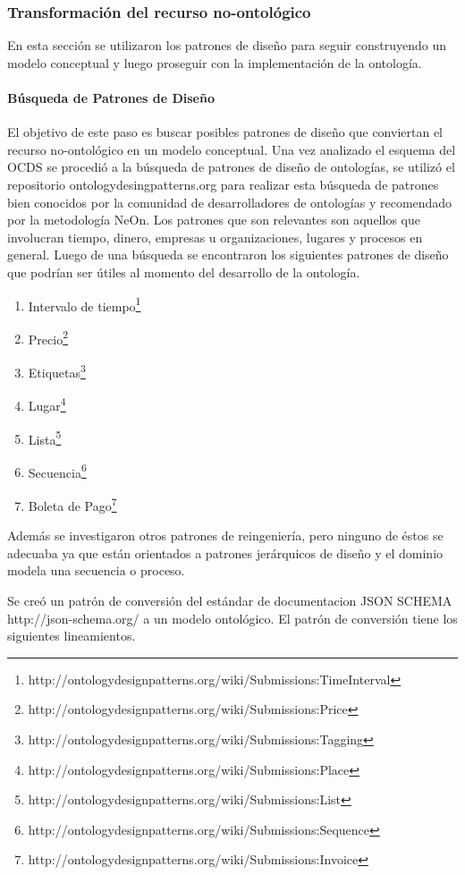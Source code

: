 \subsubsection{Transformación del recurso no-ontológico}
En esta sección se utilizaron los patrones de diseño para seguir construyendo un modelo conceptual y luego proseguir con la implementación de la ontología. 
\paragraph{Búsqueda de Patrones de Diseño}
El objetivo de este paso es buscar posibles patrones de diseño que conviertan el recurso no-ontológico en un modelo conceptual. 
Una vez analizado el esquema del OCDS se procedió a la búsqueda de patrones de diseño de ontologías, se utilizó el repositorio ontologydesingpatterns.org para realizar esta búsqueda de patrones bien conocidos por la comunidad de desarrolladores de ontologías y recomendado por la metodología NeOn.
Los patrones que son relevantes son aquellos que involucran tiempo, dinero, empresas u organizaciones, lugares y procesos en general. Luego de una búsqueda se encontraron los siguientes patrones de diseño que podrían ser útiles al momento del desarrollo de la ontología.
\begin{enumerate}
    \item Intervalo de tiempo\footnote{http://ontologydesignpatterns.org/wiki/Submissions:TimeInterval}
    \item Precio\footnote{http://ontologydesignpatterns.org/wiki/Submissions:Price} 
    \item Etiquetas\footnote{http://ontologydesignpatterns.org/wiki/Submissions:Tagging}
    \item Lugar\footnote{http://ontologydesignpatterns.org/wiki/Submissions:Place}
    \item Lista\footnote{http://ontologydesignpatterns.org/wiki/Submissions:List}
    \item Secuencia\footnote{http://ontologydesignpatterns.org/wiki/Submissions:Sequence}
    \item Boleta de Pago\footnote{http://ontologydesignpatterns.org/wiki/Submissions:Invoice} 
\end{enumerate}

Además se investigaron otros patrones de reingeniería, pero ninguno de éstos se adecuaba ya que están orientados a patrones jerárquicos de diseño y el dominio modela una secuencia o proceso. 

Se creó un patrón de conversión del estándar de documentacion JSON SCHEMA http://json-schema.org/ a un modelo ontológico. El patrón de conversión tiene los siguientes lineamientos.

